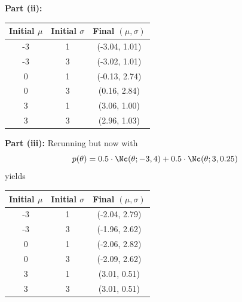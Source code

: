 \documentclass{article}
\begin{document}
\begin{homeworkProblem}
  \textbf{Part (ii):}

  \begin{table}[hp!]
    \centering
    \begin{tabular}{c|c|c}
      Initial $\mu$ & Initial $\sigma$ & Final $(\mu, \sigma)$ \\
      \hline
      -3            & 1                & (-3.04, 1.01)         \\
      -3            & 3                & (-3.02, 1.01)         \\
      0             & 1                & (-0.13, 2.74)         \\
      0             & 3                & (0.16, 2.84)          \\
      3             & 1                & (3.06, 1.00)          \\
      3             & 3                & (2.96, 1.03)          \\
    \end{tabular}
  \end{table}
  \pagebreak

  \textbf{Part (iii):} Rerunning but now with
  \[
    p(\theta) = 0.5 \cdot \Nc(\theta;-3, 4) + 0.5 \cdot \Nc(\theta;3, 0.25)
  \]
  yields

  \begin{table}[hp!]
    \centering
    \begin{tabular}{c|c|c}
      Initial $\mu$ & Initial $\sigma$ & Final $(\mu, \sigma)$ \\
      \hline
      -3            & 1                & (-2.04, 2.79)         \\
      -3            & 3                & (-1.96, 2.62)         \\
      0             & 1                & (-2.06, 2.82)         \\
      0             & 3                & (-2.09, 2.62)         \\
      3             & 1                & (3.01, 0.51)          \\
      3             & 3                & (3.01, 0.51)          \\
    \end{tabular}
  \end{table}



\end{homeworkProblem}
\end{document}
